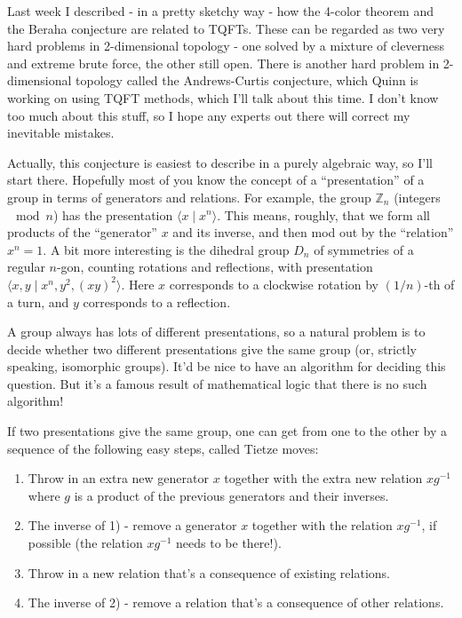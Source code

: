 \documentclass{article}
\def\tightlist{}
\begin{document}
Last week I described - in a pretty sketchy way - how the 4-color
theorem and the Beraha conjecture are related to TQFTs. These can be
regarded as two very hard problems in 2-dimensional topology - one
solved by a mixture of cleverness and extreme brute force, the other
still open. There is another hard problem in 2-dimensional topology
called the Andrews-Curtis conjecture, which Quinn is working on using
TQFT methods, which I'll talk about this time. I don't know too much
about this stuff, so I hope any experts out there will correct my
inevitable mistakes.

Actually, this conjecture is easiest to describe in a purely algebraic
way, so I'll start there. Hopefully most of you know the concept of a
``presentation'' of a group in terms of generators and relations. For
example, the group \(\mathbb{Z}_n\) (integers \(\mod n\)) has the
presentation \(\langle x \mid x^n\rangle\). This means, roughly, that we
form all products of the ``generator'' \(x\) and its inverse, and then
mod out by the ``relation'' \(x^n = 1\). A bit more interesting is the
dihedral group \(D_n\) of symmetries of a regular \(n\)-gon, counting
rotations and reflections, with presentation
\(\langle x,y \mid x^n, y^2, (xy)^2 \rangle\). Here \(x\) corresponds to
a clockwise rotation by \((1/n)\)-th of a turn, and \(y\) corresponds to
a reflection.

A group always has lots of different presentations, so a natural problem
is to decide whether two different presentations give the same group
(or, strictly speaking, isomorphic groups). It'd be nice to have an
algorithm for deciding this question. But it's a famous result of
mathematical logic that there is no such algorithm!

If two presentations give the same group, one can get from one to the
other by a sequence of the following easy steps, called Tietze moves:

\begin{enumerate}
\def\labelenumi{\arabic{enumi})}
\tightlist
\item
  Throw in an extra new generator \(x\) together with the extra new
  relation \(xg^{-1}\) where \(g\) is a product of the previous
  generators and their inverses.
\item
  The inverse of 1) - remove a generator \(x\) together with the
  relation \(xg^{-1}\), if possible (the relation \(xg^{-1}\) needs to
  be there!).
\item
  Throw in a new relation that's a consequence of existing relations.
\item
  The inverse of 2) - remove a relation that's a consequence of other
  relations.
\end{enumerate}
\end{document}
